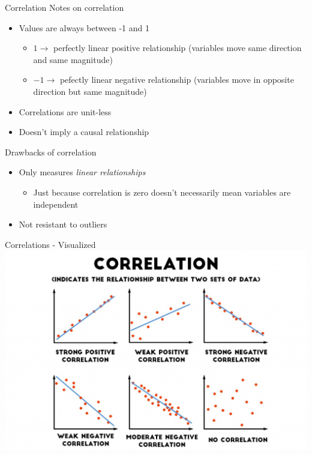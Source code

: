 \documentclass{beamer}
\begin{document}
\begin{frame}{Correlation}
	Notes on correlation
	\begin{itemize}
		\item Values are always between -1 and 1
		      \begin{itemize}
		      	\item $1 \rightarrow$ perfectly linear positive relationship (variables move same direction and same magnitude)
		      	\item $-1 \rightarrow$ pefectly linear negative relationship (variables move in opposite direction but same magnitude) 
		      \end{itemize}
		\item Correlations are unit-less
		\item \small{\alert{Doesn't imply a causal relationship}}
	\end{itemize}
	Drawbacks of correlation
	\begin{itemize}
		\item Only measures \textit{linear relationships}
		      \begin{itemize} 
		      	\item Just because correlation is zero doesn't necessarily mean variables are independent
		      \end{itemize}
		\item Not resistant to outliers
	\end{itemize}
\end{frame}

\begin{frame}{Correlations - Visualized}
	\includegraphics[width=\textwidth]{correlations.jpg}
\end{frame}
\end{document}
